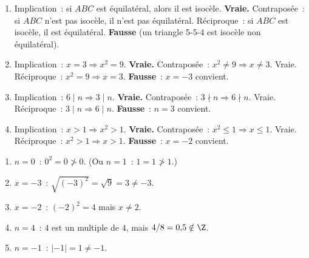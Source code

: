 
\begin{enumerate}
  \item Implication~: si $ABC$ est \'equilat\'eral, alors il est isoc\`ele.
        \textbf{Vraie.} Contrapos\'ee~: si $ABC$ n'est pas isoc\`ele, il n'est pas \'equilat\'eral.
        R\'eciproque~: si $ABC$ est isoc\`ele, il est \'equilat\'eral. \textbf{Fausse}
        (un triangle 5-5-4 est isoc\`ele non \'equilat\'eral).
  \item Implication~: $x=3\Rightarrow x^2=9$. \textbf{Vraie.}
        Contrapos\'ee~: $x^2\ne9\Rightarrow x\ne3$. Vraie.
        R\'eciproque~: $x^2=9\Rightarrow x=3$. \textbf{Fausse}~: $x=-3$ convient.
  \item Implication~: $6\mid n\Rightarrow3\mid n$. \textbf{Vraie.}
        Contrapos\'ee~: $3\nmid n\Rightarrow6\nmid n$. Vraie.
        R\'eciproque~: $3\mid n\Rightarrow6\mid n$. \textbf{Fausse}~: $n=3$ convient.
  \item Implication~: $x>1\Rightarrow x^2>1$. \textbf{Vraie.}
        Contrapos\'ee~: $x^2\leq1\Rightarrow x\leq1$. Vraie.
        R\'eciproque~: $x^2>1\Rightarrow x>1$. \textbf{Fausse}~: $x=-2$ convient.
\end{enumerate}


\begin{enumerate}
  \item $n=0$~: $0^2=0\not>0$. (Ou $n=1$~: $1=1\not>1$.)
  \item $x=-3$~: $\sqrt{(-3)^2}=\sqrt{9}=3\ne-3$.
  \item $x=-2$~: $(-2)^2=4$ mais $x\ne2$.
  \item $n=4$~: $4$ est un multiple de $4$, mais $4/8=0{,}5\notin\Z$.
  \item $n=-1$~: $|-1|=1\ne-1$.
\end{enumerate}


